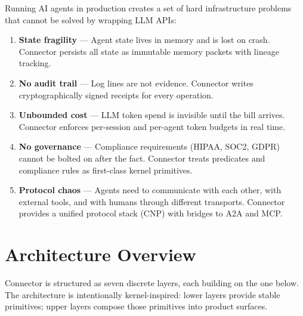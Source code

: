 Running AI agents in production creates a set of hard infrastructure problems
that cannot be solved by wrapping LLM APIs:

\begin{enumerate}
  \item \textbf{State fragility} — Agent state lives in memory and is lost on crash.
        Connector persists all state as immutable memory packets with lineage tracking.

  \item \textbf{No audit trail} — Log lines are not evidence. Connector writes
        cryptographically signed receipts for every operation.

  \item \textbf{Unbounded cost} — LLM token spend is invisible until the bill arrives.
        Connector enforces per-session and per-agent token budgets in real time.

  \item \textbf{No governance} — Compliance requirements (HIPAA, SOC2, GDPR) cannot
        be bolted on after the fact. Connector treats predicates and compliance
        rules as first-class kernel primitives.

  \item \textbf{Protocol chaos} — Agents need to communicate with each other, with
        external tools, and with humans through different transports. Connector
        provides a unified protocol stack (CNP) with bridges to A2A and MCP.
\end{enumerate}

\section{Architecture Overview}

Connector is structured as seven discrete layers, each building on the one below.
The architecture is intentionally kernel-inspired: lower layers provide
stable primitives; upper layers compose those primitives into product surfaces.


